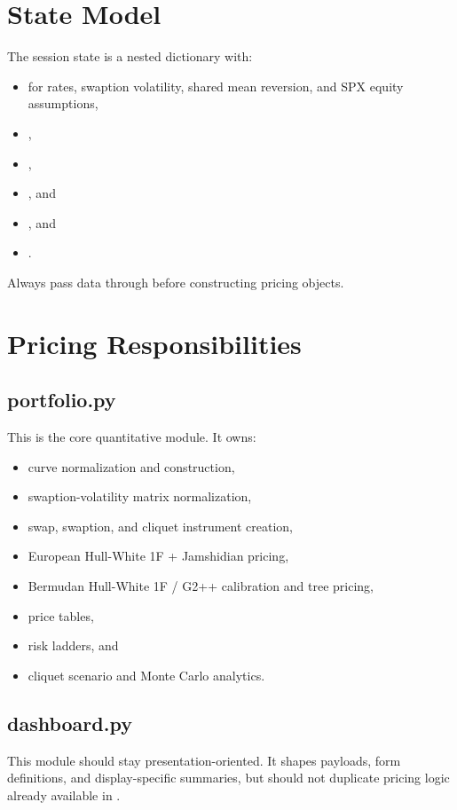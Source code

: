 \documentclass[11pt]{article}
\begin{document}
\section{State Model}
The session state is a nested dictionary with:
\begin{itemize}[leftmargin=1.5em]
    \item {} for rates, swaption volatility, shared mean reversion, and SPX equity assumptions,
    \item {},
    \item {},
    \item {}, and
    \item {}, and
    \item {}.
\end{itemize}
Always pass data through  before constructing pricing objects.

\section{Pricing Responsibilities}
\subsection{portfolio.py}
This is the core quantitative module. It owns:
\begin{itemize}[leftmargin=1.5em]
    \item curve normalization and construction,
    \item swaption-volatility matrix normalization,
    \item swap, swaption, and cliquet instrument creation,
    \item European Hull-White 1F + Jamshidian pricing,
    \item Bermudan Hull-White 1F / G2++ calibration and tree pricing,
    \item price tables,
    \item risk ladders, and
    \item cliquet scenario and Monte Carlo analytics.
\end{itemize}

\subsection{dashboard.py}
This module should stay presentation-oriented. It shapes payloads, form definitions, and display-specific summaries, but should not duplicate pricing logic already available in .
\end{document}
